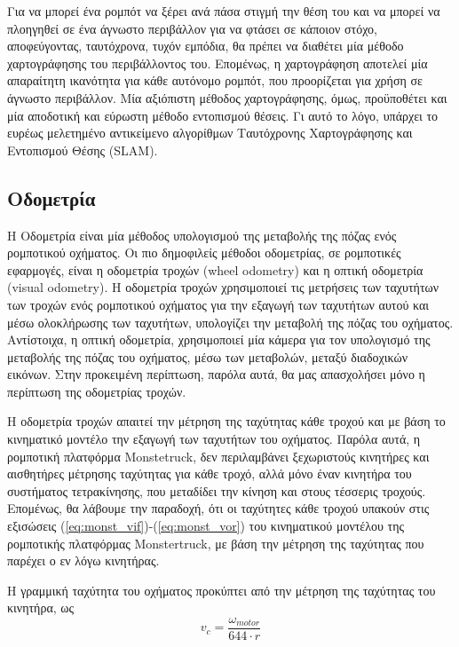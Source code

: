 \bigskip
Για να μπορεί ένα ρομπότ να ξέρει ανά πάσα στιγμή την θέση του και να μπορεί να πλοηγηθεί σε ένα άγνωστο περιβάλλον για να φτάσει σε κάποιον στόχο, αποφεύγοντας, ταυτόχρονα, τυχόν εμπόδια, θα πρέπει να διαθέτει μία μέθοδο χαρτογράφησης του περιβάλλοντος του. Επομένως, η χαρτογράφηση αποτελεί μία απαραίτητη ικανότητα για κάθε αυτόνομο ρομπότ, που προορίζεται για χρήση σε άγνωστο περιβάλλον. Μία αξιόπιστη μέθοδος χαρτογράφησης, όμως, προϋποθέτει και μία αποδοτική και εύρωστη μέθοδο εντοπισμού θέσεις. Γι αυτό το λόγο, υπάρχει το ευρέως μελετημένο αντικείμενο αλγορίθμων {Ταυτόχρονης Χαρτογράφησης και Εντοπισμού Θέσης} ({SLAM}).

\bigskip
\subsection{Οδομετρία} \label{ssec:odometry}
Η Οδομετρία είναι μία μέθοδος υπολογισμού της μεταβολής της {πόζας} ενός ρομποτικού οχήματος. Οι πιο δημοφιλείς μέθοδοι οδομετρίας, σε ρομποτικές εφαρμογές, είναι η {οδομετρία τροχών (wheel odometry)} και η {οπτική οδομετρία (visual odometry)}. Η {οδομετρία τροχών} χρησιμοποιεί τις μετρήσεις των ταχυτήτων των τροχών ενός ρομποτικού οχήματος για την εξαγωγή των ταχυτήτων αυτού και μέσω ολοκλήρωσης των ταχυτήτων, υπολογίζει την μεταβολή της πόζας του οχήματος. Αντίστοιχα, η {οπτική οδομετρία}, χρησιμοποιεί μία κάμερα για τον υπολογισμό της μεταβολής της πόζας του οχήματος, μέσω των μεταβολών, μεταξύ διαδοχικών εικόνων. Στην προκειμένη περίπτωση, παρόλα αυτά, θα μας απασχολήσει μόνο η περίπτωση της {οδομετρίας τροχών}.

\bigskip
Η {οδομετρία τροχών} απαιτεί την μέτρηση της ταχύτητας κάθε τροχού και με βάση το κινηματικό μοντέλο την εξαγωγή των ταχυτήτων του οχήματος. Παρόλα αυτά, η ρομποτική πλατφόρμα {Monstetruck}, δεν περιλαμβάνει ξεχωριστούς κινητήρες και αισθητήρες μέτρησης ταχύτητας για κάθε τροχό, αλλά μόνο έναν κινητήρα του συστήματος {τετρακίνησης}, που μεταδίδει την κίνηση και στους τέσσερις τροχούς. Επομένως, θα λάβουμε την παραδοχή, ότι οι ταχύτητες κάθε τροχού υπακούν στις εξισώσεις (\ref{eq:monst_vif})-(\ref{eq:monst_vor}) του κινηματικού μοντέλου της ρομποτικής πλατφόρμας {Monstertruck}, με βάση την μέτρηση της ταχύτητας που παρέχει ο εν λόγω κινητήρας.

\bigskip
Η γραμμική ταχύτητα του οχήματος προκύπτει από την μέτρηση της ταχύτητας του κινητήρα, ως
\begin{equation}
	v_c = \frac{\omega_{motor}}{644 \cdot r}
\end{equation}

